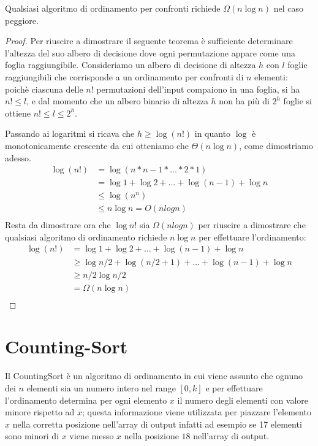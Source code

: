 \begin{thm}
Qualsiasi algoritmo di ordinamento per confronti richiede $\Omega(n \log n)$ nel caso
peggiore.
\end{thm}
\begin{proof}
Per riuscire a dimostrare il seguente teorema è sufficiente determinare l'altezza
del suo albero di decisione dove ogni permutazione appare come una foglia raggiungibile.\newline
Consideriamo un albero di decisione di altezza $h$ con $l$ foglie raggiungibili
che corrisponde a un ordinamento per confronti di $n$ elementi: poichè ciascuna delle
$n!$ permutazioni dell'input compaiono in una foglia, si ha $n! \leq l$, e dal momento
che un albero binario di altezza $h$ non ha più di $2^h$ foglie si ottiene $n! \leq l \leq 2^h$.

Passando ai logaritmi si ricava che $h \geq \log(n!)$ in quanto $\log$ è monotonicamente crescente
da cui otteniamo che $\Theta(n \log n)$, come dimostriamo adesso.
\begin{equation*}
\begin{split}
 \log (n!) & = \log (n* n-1 * \dots * 2 * 1) \\
            & = \log 1 + \log 2 + \dots + \log (n-1) + \log n \\
            & \leq \log (n^n) \\
            & \leq n \log n = O(n log n) \\
\end{split}
\end{equation*}
Resta da dimostrare ora che $\log n!$ sia $\Omega(n log n)$ per riuscire a dimostrare
che qualsiasi algoritmo di ordinamento richiede $n \log n$ per effettuare l'ordinamento:
\begin{equation*}
\begin{split}
 \log (n!) & = \log 1 + \log 2 + \dots + \log (n-1) + \log n \\
            & \geq \log n/2 + \log (n/2 + 1) + \dots + \log (n-1) + \log n \\
            & \geq n/2 \log n/2 \\
            & = \Omega(n \log n) \\
\end{split}
\end{equation*}
\end{proof}

\section{Counting-Sort}
Il CountingSort è un algoritmo di ordinamento in cui viene assunto che ognuno dei $n$ elementi
sia un numero intero nel range $[0,k]$ e per effettuare l'ordinamento determina per ogni
elemento $x$ il numero degli elementi con valore minore rispetto ad $x$; questa
informazione viene  utilizzata per piazzare l'elemento $x$ nella corretta posizione
nell'array di output infatti ad esempio se 17 elementi sono minori di $x$ viene
messo $x$ nella posizione $18$ nell'array di output.

